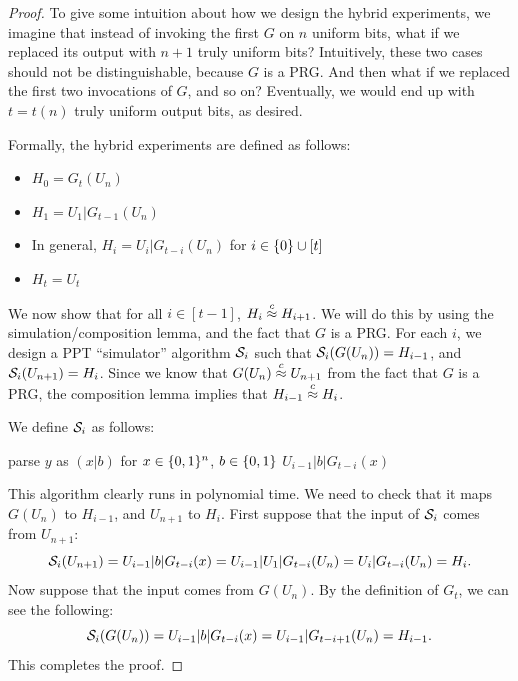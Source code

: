 \documentclass[11pt]{article}
\begin{document}
\begin{proof}
  To give some intuition about how we design the hybrid experiments,
  we imagine that instead of invoking the first $G$ on $n$ uniform
  bits, what if we replaced its output with $n+1$ truly uniform bits?
  Intuitively, these two cases should not be distinguishable, because
  $G$ is a PRG.  And then what if we replaced the first two
  invocations of $G$, and so on?  Eventually, we would end up with $t
  = t(n)$ truly uniform output bits, as desired.

  Formally, the hybrid experiments are defined as follows:
  \begin{itemize}
  \item $H_0 = G_t(U_n)$
  \item $H_1 = U_1 | G_{t-1}(U_n)$
  \item In general, $H_i = U_i | G_{t-i}(U_n)$ for $i \in \{0\} \cup
    [t]$
  \item $H_t = U_{t}$
  \end{itemize}

  We now show that for all $i \in [t-1]$, $H_i \stackrel{c}{\approx} H_{i+1}$.  We
  will do this by using the simulation/composition lemma, and the fact
  that $G$ is a PRG.  For each $i$, we design a PPT ``simulator''
  algorithm $\mathcal{S}_i$ such that $\mathcal{S}_i(G(U_n))=H_{i-1}$, and
  $\mathcal{S}_i(U_{n+1})=H_i$.  Since we know that $G(U_n) \stackrel{c}{\approx} U_{n+1}$
  from the fact that $G$ is a PRG, the composition lemma implies that
  $H_{i-1} \stackrel{c}{\approx} H_i$.

  We define $\mathcal{S}_i$ as follows:
  \begin{algorithm}[h]
    \caption{$\Sim_i(y \in \bit^{n+1})$}
    \begin{algorithmic}
      \STATE parse $y$ as $(x|b)$ for $x \in \{0,1\}^{n}$, $b \in \{0,1\}$
      \RETURN $U_{i-1} | b | G_{t-i}(x)$
    \end{algorithmic}
  \end{algorithm}

  This algorithm clearly runs in polynomial time.  We need to check
  that it maps $G(U_n)$ to $H_{i-1}$, and $U_{n+1}$ to $H_i$.  First
  suppose that the input of $\mathcal{S}_i$ comes from $U_{n+1}$:
  \[ \mathcal{S}_i(U_{n+1})= U_{i-1} | b | G_{t-i}(x) = U_{i-1} | U_1 |
  G_{t-i}(U_n)=U_i | G_{t-i}(U_n) = H_i. \] Now suppose that the input
  comes from $G(U_n)$.  By the definition of $G_t$, we can see the
  following:
  \[ \mathcal{S}_i(G(U_n)) = U_{i-1} | b | G_{t-i}(x) = U_{i-1} |
  G_{t-i+1}(U_n)=H_{i-1}. \]
  This completes the proof.
\end{proof}
\end{document}
